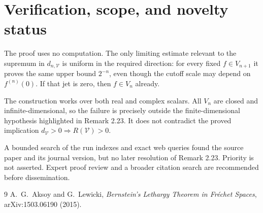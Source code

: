 \documentclass[11pt]{article}
\newcommand{\V}{\mathcal V}
\begin{document}
\section{Verification, scope, and novelty status}

The proof uses no computation. The only limiting estimate relevant to the
supremum in $d_{n,\V}$ is uniform in the required direction: for every fixed
$f\in V_{n+1}$ it proves the same upper bound $2^{-n}$, even though the
cutoff scale may depend on $f^{(n)}(0)$. If that jet is zero, then
$f\in V_n$ already.

The construction works over both real and complex scalars. All $V_n$ are
closed and infinite-dimensional, so the failure is precisely outside the
finite-dimensional hypothesis highlighted in Remark 2.23. It does not
contradict the proved implication $d_{\V}>0\Rightarrow R(\V)>0$.

A bounded search of the run indexes and exact web queries found the source
paper and its journal version, but no later resolution of Remark 2.23.
Priority is not asserted. Expert proof review and a broader citation search
are recommended before dissemination.

\begin{thebibliography}{9}
A.~G.~Aksoy and G.~Lewicki,
\emph{Bernstein's Lethargy Theorem in Fr\'echet Spaces},
arXiv:1503.06190 (2015).
\end{thebibliography}
\end{document}
